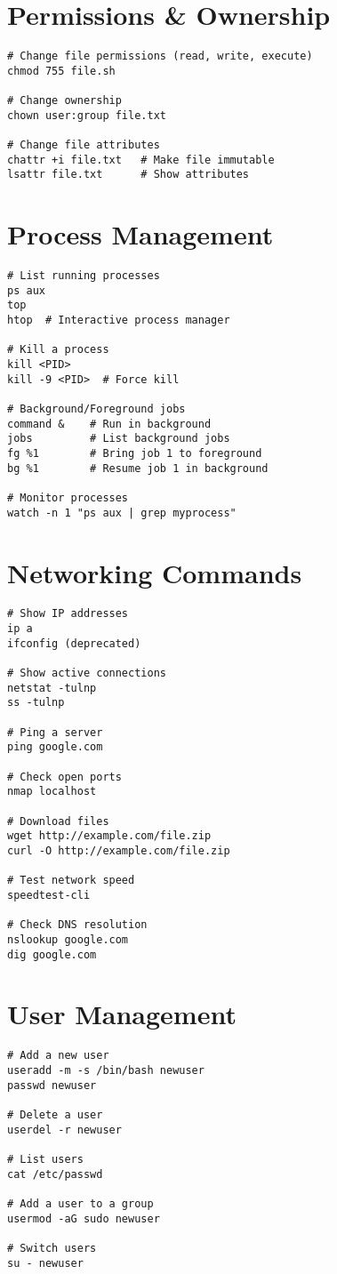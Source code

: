 \documentclass[11pt]{article}
\begin{document}
    \section*{Permissions & Ownership}
    \begin{lstlisting}[style=linuxStyle]
# Change file permissions (read, write, execute)
chmod 755 file.sh

# Change ownership
chown user:group file.txt

# Change file attributes
chattr +i file.txt   # Make file immutable
lsattr file.txt      # Show attributes
    \end{lstlisting}

    \section*{Process Management}
    \begin{lstlisting}[style=linuxStyle]
# List running processes
ps aux
top
htop  # Interactive process manager

# Kill a process
kill <PID>
kill -9 <PID>  # Force kill

# Background/Foreground jobs
command &    # Run in background
jobs         # List background jobs
fg %1        # Bring job 1 to foreground
bg %1        # Resume job 1 in background

# Monitor processes
watch -n 1 "ps aux | grep myprocess"
    \end{lstlisting}

    \section*{Networking Commands}
    \begin{lstlisting}[style=linuxStyle]
# Show IP addresses
ip a
ifconfig (deprecated)

# Show active connections
netstat -tulnp
ss -tulnp

# Ping a server
ping google.com

# Check open ports
nmap localhost

# Download files
wget http://example.com/file.zip
curl -O http://example.com/file.zip

# Test network speed
speedtest-cli

# Check DNS resolution
nslookup google.com
dig google.com
    \end{lstlisting}

    \section*{User Management}
    \begin{lstlisting}[style=linuxStyle]
# Add a new user
useradd -m -s /bin/bash newuser
passwd newuser

# Delete a user
userdel -r newuser

# List users
cat /etc/passwd

# Add a user to a group
usermod -aG sudo newuser

# Switch users
su - newuser
    \end{lstlisting}
\end{document}
